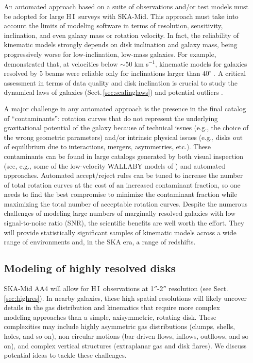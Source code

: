 \documentclass[a4paper,11pt]{article}
\newcommand{\hi } {{\rm H}\,{\small\rm I}}
\begin{document}
An automated approach based on a suite of observations and/or test models must be adopted for large \hi\ surveys with SKA-Mid. This approach must take into account the limits of modeling software in terms of resolution, sensitivity, inclination, and even galaxy mass or rotation velocity. In fact, the reliability of kinematic models strongly depends on disk inclination and galaxy mass, being progressively worse for low-inclination, low-mass galaxies. For example, \citet{Deg2025} demonstrated that, at velocities below $\sim$50 km s$^{-1}$, kinematic models for galaxies resolved by $5$ beams were reliable only for inclinations larger than $40^{\circ}$ \citep[see also][]{Rhee2004, KuziodeNaray2006, Read2016b}. A critical assessment in terms of data quality and disk inclination is crucial to study the dynamical laws of galaxies (Sect.\,\ref{sec:scalinglaws}) and potential outliers \citep[e.g.,][]{Lelli2024}.  

A major challenge in any automated approach is the presence in the final catalog of ``contaminants'': rotation curves that do not represent the underlying gravitational potential of the galaxy because of technical issues (e.g., the choice of the wrong geometric parameters) and/or intrinsic physical issues (e.g., disks out of equilibrium due to interactions, mergers, asymmetries, etc.). These contaminants can be found in large catalogs generated by both visual inspection (see, e.g., some of the low-velocity WALLABY models of \citealt{Deg2022}) and automated approaches. Automated accept/reject rules can be tuned to increase the number of total rotation curves at the cost of an increased contaminant fraction, so one needs to find the best compromise to minimize the contaminant fraction while maximizing the total number of acceptable rotation curves. Despite the numerous challenges of modeling large numbers of marginally resolved galaxies with low signal-to-noise ratio (SNR), the scientific benefits are well worth the effort. They will provide statistically significant samples of kinematic models across a wide range of environments and, in the SKA era, a range of redshifts.

\subsection{Modeling of highly resolved disks}\label{sec:mod_highres}

SKA-Mid AA4 will allow for \hi\ observations at 1$''$-2$''$ resolution (see Sect.\,\ref{sec:highres}). In nearby galaxies, these high spatial resolutions will likely uncover details in the gas distribution and kinematics that require more complex modeling approaches than a simple, axisymmetric, rotating disk. These complexities may include highly asymmetric gas distributions (clumps, shells, holes, and so on), non-circular motions (bar-driven flows, inflows, outflows, and so on), and complex vertical structures (extraplanar gas and disk flares). We discuss potential ideas to tackle these challenges.
\end{document}
